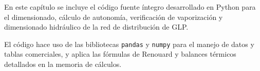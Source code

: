 \documentclass[12pt]{article}
\begin{document}
        

        

    \label{Bibliografía}
    
    \begingroup
    \renewcommand{\section}[2]{}
    
    \endgroup

    \label{Planos}
  
        
        
        
   
    \label{Codigo}
    
    En este capítulo se incluye el código fuente íntegro desarrollado en Python para el dimensionado, cálculo de autonomía, verificación de vaporización y dimensionado hidráulico de la red de distribución de GLP. 
    
    El código hace uso de las bibliotecas \texttt{pandas} y \texttt{numpy} para el manejo de datos y tablas comerciales, y aplica las fórmulas de Renouard y balances térmicos detallados en la memoria de cálculos.

    
    



        
\end{document}
